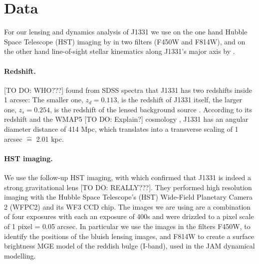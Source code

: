 \section{Data} \label{sec:data}

For our lensing and dynamics analysis of J1331 we use on the one hand Hubble Space Telescope (HST) imaging by \cite{SWELLSI} in two filters (F450W and F814W), and on the other hand line-of-sight stellar kinematics along J1331's major axis by \citet{SWELLSV}.

\paragraph{Redshift.} [TO DO: WHO???] found from SDSS spectra that J1331 has two redshifts inside 1 arcsec: The smaller one, $z_d = 0.113$, is the redshift of J1331 itself, the larger one, $z_s = 0.254$, is the redshift of the lensed background source \citep{SWELLSIII}. According to its redshift and the WMAP5 [TO DO: Explain?] cosmology \citep{WMAP5cosm}, J1331 has an angular diameter distance of 414 Mpc, which translates into a transverse scaling of 1 arcsec $\hat{=}$ 2.01 kpc.

\paragraph{HST imaging.} We use the follow-up HST imaging, with which \citet{SWELLSI} confirmed that J1331 is indeed a strong gravitational lens [TO DO: REALLY???]. They performed high resolution imaging with the Hubble Space Telescope's (HST) Wide-Field Planetary Camera 2 (WFPC2) and its WF3 CCD chip.  The images we are using are a combination of four exposures with each an exposure of 400s and were drizzled to a pixel scale of 1 pixel = 0.05 arcsec. In particular we use the images in the filters F450W, to identify the positions of the bluish lensing images, and F814W to create a surface brightness MGE model of the reddish bulge (I-band), used in the JAM dynamical modelling.

